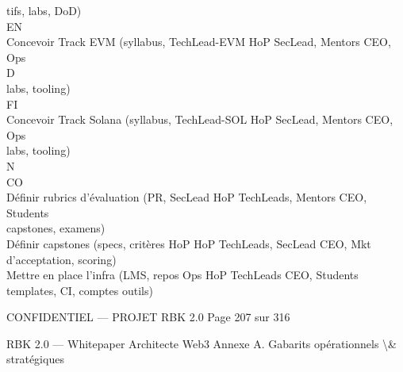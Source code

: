 tifs, labs, DoD)\\
\vspace{0.5em}
\vspace{0.5em}
\vspace{0.5em}
\vspace{0.5em}
EN\\
Concevoir Track EVM (syllabus,       TechLead-EVM     HoP              SecLead, Mentors            CEO, Ops\\
\vspace{0.5em}
\vspace{0.5em}
\vspace{0.5em}
\vspace{0.5em}
D\\
labs, tooling)\\
\vspace{0.5em}
\vspace{0.5em}
\vspace{0.5em}
\vspace{0.5em}
FI\\
Concevoir Track Solana (syllabus,    TechLead-SOL     HoP              SecLead, Mentors            CEO, Ops\\
labs, tooling)\\
N\\
CO\\
Définir rubrics d’évaluation (PR,    SecLead          HoP              TechLeads, Mentors          CEO, Students\\
capstones, examens)\\
Définir capstones (specs, critères   HoP              HoP              TechLeads, SecLead          CEO, Mkt\\
d’acceptation, scoring)\\
Mettre en place l’infra (LMS, repos Ops               HoP              TechLeads                   CEO, Students\\
templates, CI, comptes outils)\\
\vspace{0.5em}
\vspace{0.5em}
\vspace{0.5em}
\vspace{0.5em}
\begin{confidential}CONFIDENTIEL — PROJET RBK 2.0                          Page 207 sur 316\end{confidential}
RBK 2.0 — Whitepaper Architecte Web3                                                        Annexe A. Gabarits opérationnels \textbackslash{}& stratégiques\\
